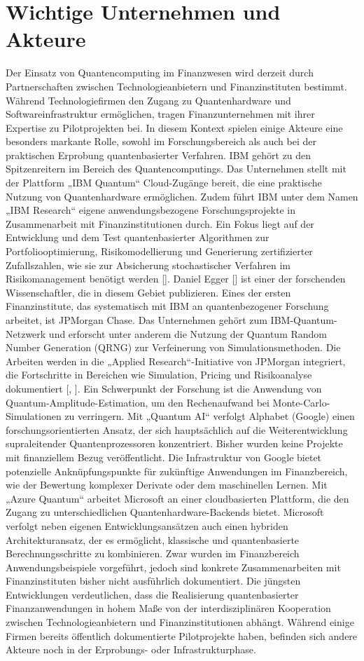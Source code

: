 \section{Wichtige Unternehmen und Akteure}
Der Einsatz von Quantencomputing im Finanzwesen wird derzeit durch Partnerschaften zwischen Technologieanbietern und Finanzinstituten bestimmt. Während Technologiefirmen den Zugang zu Quantenhardware und Softwareinfrastruktur ermöglichen, tragen Finanzunternehmen mit ihrer Expertise zu Pilotprojekten bei. In diesem Kontext spielen einige Akteure eine besonders markante Rolle, sowohl im Forschungsbereich als auch bei der praktischen Erprobung quantenbasierter Verfahren.
IBM gehört zu den Spitzenreitern im Bereich des Quantencomputings. Das Unternehmen stellt mit der Plattform „IBM Quantum“ Cloud-Zugänge bereit, die eine praktische Nutzung von Quantenhardware ermöglichen. Zudem führt IBM unter dem Namen „IBM Research“ eigene anwendungsbezogene Forschungsprojekte in Zusammenarbeit mit Finanzinstitutionen durch. Ein Fokus liegt auf der Entwicklung und dem Test quantenbasierter Algorithmen zur Portfoliooptimierung, Risikomodellierung und Generierung zertifizierter Zufallszahlen, wie sie zur Absicherung stochastischer Verfahren im Risikomanagement benötigt werden [\cite{jpmorgan_certified}]. Daniel Egger [\cite{ibm_egger}] ist einer der forschenden Wissenschaftler, die in diesem Gebiet publizieren.
Eines der ersten Finanzinstitute, das systematisch mit IBM an quantenbezogener Forschung arbeitet, ist JPMorgan Chase. Das Unternehmen gehört zum IBM-Quantum-Netzwerk und erforscht unter anderem die Nutzung der Quantum Random Number Generation (QRNG) zur Verfeinerung von Simulationsmethoden. Die Arbeiten werden in die „Applied Research“-Initiative von JPMorgan integriert, die Fortschritte in Bereichen wie Simulation, Pricing und Risikoanalyse dokumentiert [\cite{jpmorgan_certified}, \cite{jpmorgan_applied}]. Ein Schwerpunkt der Forschung ist die Anwendung von Quantum-Amplitude-Estimation, um den Rechenaufwand bei Monte-Carlo-Simulationen zu verringern.
Mit „Quantum AI“ verfolgt Alphabet (Google) einen forschungsorientierten Ansatz, der sich hauptsächlich auf die Weiterentwicklung supraleitender Quantenprozessoren konzentriert. Bisher wurden keine Projekte mit finanziellem Bezug veröffentlicht. Die Infrastruktur von Google bietet potenzielle Anknüpfungspunkte für zukünftige Anwendungen im Finanzbereich, wie der Bewertung komplexer Derivate oder dem maschinellen Lernen.
Mit „Azure Quantum“ arbeitet Microsoft an einer cloudbasierten Plattform, die den Zugang zu unterschiedlichen Quantenhardware-Backends bietet. Microsoft verfolgt neben eigenen Entwicklungsansätzen auch einen hybriden Architekturansatz, der es ermöglicht, klassische und quantenbasierte Berechnungsschritte zu kombinieren. Zwar wurden im Finanzbereich Anwendungsbeispiele vorgeführt, jedoch sind konkrete Zusammenarbeiten mit Finanzinstituten bisher nicht ausführlich dokumentiert.
Die jüngsten Entwicklungen verdeutlichen, dass die Realisierung quantenbasierter Finanzanwendungen in hohem Maße von der interdisziplinären Kooperation zwischen Technologieanbietern und Finanzinstitutionen abhängt. Während einige Firmen bereits öffentlich dokumentierte Pilotprojekte haben, befinden sich andere Akteure noch in der Erprobungs- oder Infrastrukturphase.



